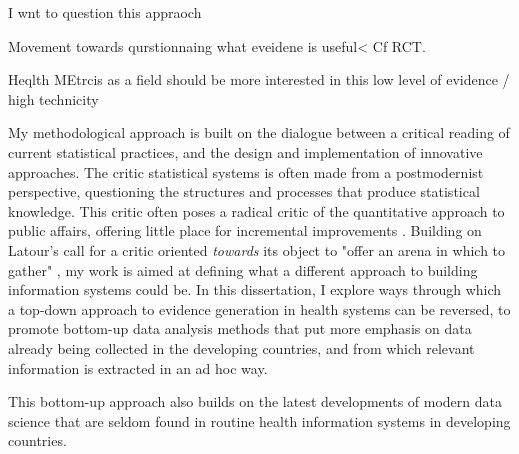 I wnt to question this appraoch

Movement towards qurstionnaing what eveidene is useful< Cf RCT.

Heqlth MEtrcis as a field should be more interested in this low level of evidence / high technicity

My methodological approach is built on the dialogue between a critical reading of current statistical practices, and the design and implementation of innovative approaches. The critic statistical systems is often made from a postmodernist perspective, questioning the structures and processes that produce statistical knowledge. This critic  often poses a radical critic of the quantitative approach to public affairs, offering little place for incremental improvements \citep{rottenburg_world_2016}. Building on Latour's call for a critic oriented \textit{towards} its object to "offer an arena in which to gather" \citep{latour_why_2004}, my work is aimed at defining what a different approach to building information systems could be. In this dissertation, I explore ways through which a top-down approach to evidence generation in health systems can be reversed, to promote  bottom-up data analysis methods that put more emphasis on data already being collected in the developing countries, and from which relevant information is extracted in an ad hoc way.

This bottom-up approach also builds on the latest developments of modern data science that are seldom found in routine health information systems in developing countries.

